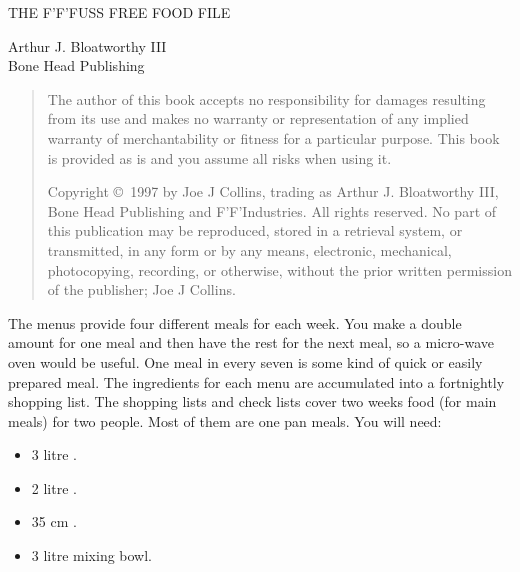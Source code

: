 \documentclass{cookbook}
\begin{document}
\thispagestyle{empty}

\begin{center}
	\Huge THE F'F'FUSS FREE FOOD FILE%
\end{center}

\vfill

\begin{center}
	Arthur J. Bloatworthy III\\
	Bone Head Publishing
\end{center}

\clearpage

\strut%
\vfill

\begin{quotation}
\begin{rmfamily}
	The author of this book
	accepts no responsibility
	for damages resulting from its use
	and makes no warranty or
	representation of
	any implied warranty of merchantability
	or fitness for a particular purpose.
	This book is provided as is
	and you assume all risks
	when using it.
\par
\bigskip
	Copyright \copyright\ 1997 by
	Joe J Collins,
	trading as
	Arthur J. Bloatworthy III,
	Bone Head Publishing and
	F'F'Industries.
	All rights reserved.
	No part of this publication may be reproduced,
	stored in a retrieval system,
	or transmitted,
	in any form or by any means,
	electronic,
	mechanical,
	photocopying,
	recording,
	or otherwise,
	without the prior written permission
	of the publisher;
	Joe J Collins.
\end{rmfamily}
\end{quotation}

\clearpage

The menus provide four different meals
for each week.
You make a double amount for one meal
and then have the rest for the next meal,
so a micro-wave oven would be useful.
One meal in every seven is some kind of quick
or easily prepared meal.
The ingredients for each menu are accumulated
into a fortnightly shopping list.
The shopping lists
and check lists cover two weeks food
(for main meals)
for two people.
Most of them are one pan meals.
You will need:

\begin{itemize}
	\item 3 litre \cass.
	\item 2 litre \pan.
	\item 35 cm \wok.
	\item 3 litre mixing bowl.
\end{itemize}
\end{document}
